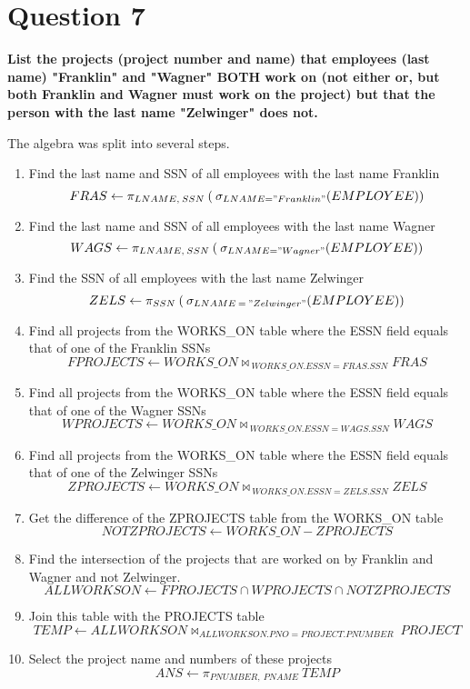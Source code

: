 \documentclass{article}
\begin{document}
\section{Question 7}

    \textbf{List the projects (project number and name) that employees (last name)  "Franklin" and "Wagner" BOTH work on (not either or, but both Franklin and Wagner must work on the project) but that the person with the last name "Zelwinger" does not.}
    
    The algebra was split into several steps.

    \begin{enumerate}
        \item Find the last name and SSN of all employees with the last name Franklin
        \[ FRAS \gets \pi _{LNAME, \: SSN} \: ( \: \sigma _{LNAME = "Franklin"} (EMPLOYEE)) \]
        \item Find the last name and SSN of all employees with the last name Wagner
        \[ WAGS \gets \pi _{LNAME, \: SSN} \: ( \: \sigma _{LNAME = "Wagner" } (EMPLOYEE)) \]
        \item Find the SSN of all employees with the last name Zelwinger
        \[ ZELS \gets \pi _{SSN} \: ( \: \sigma _{LNAME \: = \: "Zelwinger"} (EMPLOYEE)) \]
        \item Find all projects from the WORKS\_ON table where the ESSN field equals that of one of the Franklin SSNs
        \[ FPROJECTS \gets WORKS\_ON \bowtie _{\: WORKS\_ON.ESSN = FRAS.SSN} FRAS \]
        \item Find all projects from the WORKS\_ON table where the ESSN field equals that of one of the Wagner SSNs
        \[ WPROJECTS \gets WORKS\_ON \bowtie _{\: WORKS\_ON.ESSN = WAGS.SSN} WAGS \]
        \item Find all projects from the WORKS\_ON table where the ESSN field equals that of one of the Zelwinger SSNs
        \[ ZPROJECTS \gets WORKS\_ON \bowtie _{\: WORKS\_ON.ESSN = ZELS.SSN} ZELS \]
        \item Get the difference of the ZPROJECTS table from the WORKS\_ON table
        \[ NOTZPROJECTS \gets WORKS\_ON - ZPROJECTS  \]
        \item Find the intersection of the projects that are worked on by Franklin and Wagner and not Zelwinger. 
        \[ ALLWORKSON \gets FPROJECTS \cap WPROJECTS \cap NOTZPROJECTS\]
        \item Join this table with the PROJECTS table
        \[ TEMP \gets ALLWORKSON \bowtie _{ALLWORKSON.PNO = PROJECT.PNUMBER} \: PROJECT\]
        \item Select the project name and numbers of these projects
        \[ ANS \gets \pi _{PNUMBER, \: PNAME} \: TEMP \]
        
    \end{enumerate}
\end{document}
